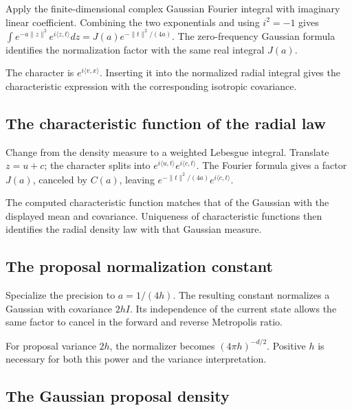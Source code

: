 \documentclass[11pt,a4paper]{article}
\begin{document}
Apply the finite-dimensional complex Gaussian Fourier integral with imaginary linear coefficient. Combining the two exponentials and using \(i^2=-1\) gives \(\int e^{-a\|z\|^2}e^{i\langle z,t\rangle}dz=J(a)e^{-\|t\|^2/(4a)}\). The zero-frequency Gaussian formula identifies the normalization factor with the same real integral \(J(a)\).



The character is \(e^{i\langle v,x\rangle}\). Inserting it into the normalized radial integral gives the characteristic expression with the corresponding isotropic covariance.


\subsection{\texorpdfstring{The characteristic function of the radial law}{The characteristic function of the radial law}}


Change from the density measure to a weighted Lebesgue integral. Translate \(z=u+c\); the character splits into \(e^{i\langle u,t\rangle}e^{i\langle c,t\rangle}\). The Fourier formula gives a factor \(J(a)\), canceled by \(C(a)\), leaving \(e^{-\|t\|^2/(4a)}e^{i\langle c,t\rangle}\).



The computed characteristic function matches that of the Gaussian with the displayed mean and covariance. Uniqueness of characteristic functions then identifies the radial density law with that Gaussian measure.


\subsection{\texorpdfstring{The proposal normalization constant}{The proposal normalization constant}}


Specialize the precision to \(a=1/(4h)\). The resulting constant normalizes a Gaussian with covariance \(2hI\). Its independence of the current state allows the same factor to cancel in the forward and reverse Metropolis ratio.



For proposal variance \(2h\), the normalizer becomes \((4\pi h)^{-d/2}\). Positive \(h\) is necessary for both this power and the variance interpretation.


\subsection{\texorpdfstring{The Gaussian proposal density}{The Gaussian proposal density}}
\end{document}
